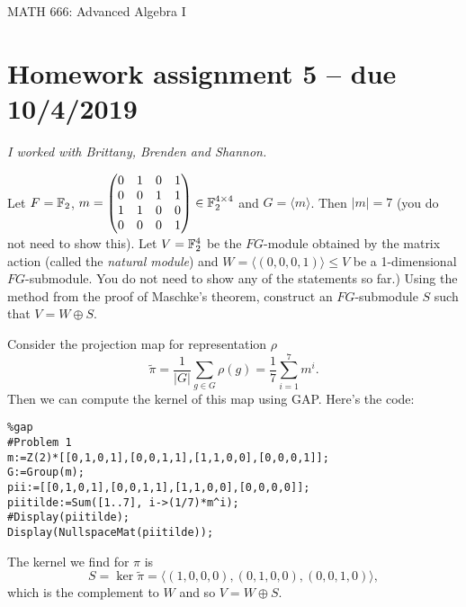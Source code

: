 \documentclass[leqno]{article}
\author{Colin Roberts}
\begin{document}
\begin{center}
  \begin{huge}
    MATH 666: Advanced Algebra I
  \end{huge}
\end{center}

\section*{Homework assignment 5 -- due 10/4/2019}
\noindent \emph{I worked with Brittany, Brenden and Shannon.}
\setcounter{problem}{18}

\begin{problem}
Let $F=\mathbb{F}_2$, $m=\begin{pmatrix} 0 & 1 & 0 & 1 \\ 0 & 0 & 1 & 1\\ 1 & 1 & 0 & 0\\ 0 & 0 & 0 & 1 \end{pmatrix}\in \mathbb{F}_2^{4\times 4}$ and $G=\langle m\rangle$. Then $|m|=7$ (you do not need to show this). Let $V=\mathbb{F}_2^4$ be the $FG$-module obtained by the matrix action (called the \emph{natural module}) and $W=\langle (0,0,0,1)\rangle \leq V$ be a 1-dimensional $FG$-submodule. You do not need to show any of the statements so far.) Using the method from the proof of \textsf{Maschke's} theorem, construct an $FG$-submodule $S$ such that $V=W\oplus S$.
\end{problem}
\begin{solution}
Consider the projection map for representation $\rho$
\[
\tilde{\pi} = \frac{1}{|G|} \sum_{g\in G} \rho(g) = \frac{1}{7}\sum_{i=1}^7 m^i.
\]
Then we can compute the kernel of this map using \textsf{GAP}.  Here's the code:
\begin{verbatim}
%gap
#Problem 1
m:=Z(2)*[[0,1,0,1],[0,0,1,1],[1,1,0,0],[0,0,0,1]];
G:=Group(m);
pii:=[[0,1,0,1],[0,0,1,1],[1,1,0,0],[0,0,0,0]];
piitilde:=Sum([1..7], i->(1/7)*m^i);
#Display(piitilde);
Display(NullspaceMat(piitilde));
\end{verbatim}
The kernel we find for $\pi$ is
\[
S= \ker \tilde{\pi} = \langle (1,0,0,0),(0,1,0,0),(0,0,1,0)\rangle,
\]
which is the complement to $W$ and so $V=W\oplus S$.
\end{solution}
\end{document}
